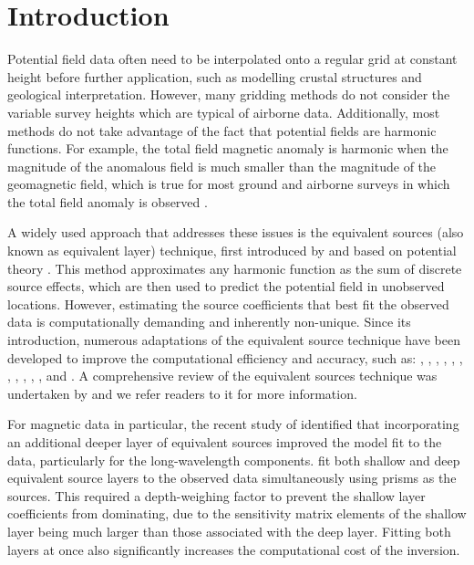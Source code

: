 \newcommand{\norm}[1]{\lVert #1 \rVert}
\newcommand{\vecbf}[1]{\vec{\mathbf{#1}}}
\newcommand{\uvec}[1]{\hat{\mathbf{#1}}}
\newcommand{\bvec}[1]{\bar{\mathbf{#1}}}
\newcommand{\mat}[1]{\bar{\bar{\mathbf{#1}}}}


\section{Introduction}

Potential field data often need to be interpolated onto a regular grid at constant height before further application, such as modelling crustal structures and geological interpretation. However, many gridding methods do not consider the variable survey heights which are typical of airborne data. Additionally, most methods do not take advantage of the fact that potential fields are harmonic functions. For example, the total field magnetic anomaly is harmonic when the magnitude of the anomalous field is much smaller than the magnitude of the geomagnetic field, which is true for most ground and airborne surveys in which the total field anomaly is observed \citep{Blakley1995}.

A widely used approach that addresses these issues is the equivalent sources (also known as equivalent layer) technique, first introduced by \citet{Dampney1969} and based on potential theory \citep{Kellogg1967}. This method approximates any harmonic function as the sum of discrete source effects, which are then used to predict the potential field in unobserved locations. However, estimating the source coefficients that best fit the observed data is computationally demanding and inherently non-unique. Since its introduction, numerous adaptations of the equivalent source technique have been developed to improve the computational efficiency and accuracy, such as: \citet{Leao1989}, \citet{Cordell1992}, \citet{Mendona1994}, \citet{Guspi2009}, \citet{Li2010}, \citet{OliveiraJr2013}, \citet{Siqueira2017}, \citet{Jirigalatu2019}, \citet{Mendona2020}, \citet{Li2020}, \citet{Soler2021}, \citet{Takahashi2022} and \citet{Piauilino2024}. A comprehensive review of the equivalent sources technique was undertaken by \citet{OliveiraJr2023} and we refer readers to it for more information.

For magnetic data in particular, the recent study of \citet{Li2020} identified that incorporating an additional deeper layer of equivalent sources improved the model fit to the data, particularly for the long-wavelength components. \citet{Li2020} fit both shallow and deep equivalent source layers to the observed data simultaneously using prisms as the sources. This required a depth-weighing factor to prevent the shallow layer coefficients from dominating, due to the sensitivity matrix elements of the shallow layer being much larger than those associated with the deep layer. Fitting both layers at once also significantly increases the computational cost of the inversion.

